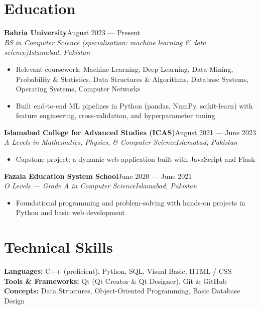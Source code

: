 \documentclass[10pt,a4paper]{article}
\newcommand{\entry}[4]{%
  \vspace{4pt}
  \noindent\textbf{#1}\hfill #2\\
  \noindent\textit{#3}\hfill \textit{#4}\\
  \vspace{-6pt}
}
\newcommand{\skill}[2]{\textbf{#1:} #2\\}
\begin{document}
\section*{Education}

\entry{Bahria University}{August 2023 --- Present}
      {BS in Computer Science (specialisation: machine learning \& data science)}{Islamabad, Pakistan}
\begin{itemize}
  \item Relevant coursework: Machine Learning, Deep Learning, Data Mining, Probability \& Statistics, Data Structures \& Algorithms, Database Systems, Operating Systems, Computer Networks
  \item Built end-to-end ML pipelines in Python (pandas, NumPy, scikit-learn) with feature engineering, cross-validation, and hyperparameter tuning
\end{itemize}

\entry{Islamabad College for Advanced Studies (ICAS)}{August 2021 --- June 2023}
      {A Levels in Mathematics, Physics, \& Computer Science}{Islamabad, Pakistan}
\begin{itemize}
  \item Capstone project: a dynamic web application built with JavaScript and Flask
\end{itemize}

\entry{Fazaia Education System School}{June 2020 --- June 2021}
      {O Levels --- Grade A in Computer Science}{Islamabad, Pakistan}
\begin{itemize}
  \item Foundational programming and problem-solving with hands-on projects in Python and basic web development
\end{itemize}

\section*{Technical Skills}
\skill{Languages}{C++ (proficient), Python, SQL, Visual Basic, HTML / CSS}
\skill{Tools \& Frameworks}{Qt (Qt Creator \& Qt Designer), Git \& GitHub}
\skill{Concepts}{Data Structures, Object-Oriented Programming, Basic Database Design}
\end{document}
